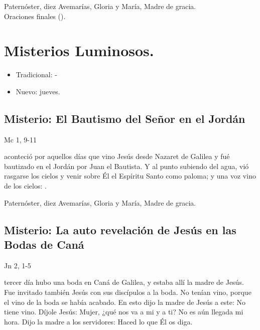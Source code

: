\documentclass[./main.tex]{subfiles}
\newcounter{lux-counter}
\begin{document}
\begin{center}
      Paternóster, diez Avemarías, Gloria y María, Madre de gracia.\\
      Oraciones finales ().
\end{center}

\section*{Misterios Luminosos.}
\begin{itemize}
      \item Tradicional: -
      \item Nuevo: jueves.
\end{itemize}

\subsection*{ Misterio: El Bautismo del Señor en el Jordán}
\begin{flushright}
      {\color{red}Mc 1, 9-11}
\end{flushright}
 aconteció por aquellos días que vino Jesús desde Nazaret de Galilea y fué bautizado en el Jordán por Juan el Bautista. 
Y al punto subiendo del agua, vió rasgarse los cielos y venir sobre Él el Espíritu Santo como paloma; y una voz vino de los cielos: 
.

\begin{center}
      Paternóster, diez Avemarías, Gloria y María, Madre de gracia.
\end{center}

\subsection*{ Misterio: La auto revelación de Jesús en las Bodas de Caná}
\begin{flushright}
      {\color{red}Jn 2, 1-5}
\end{flushright}
 tercer día hubo una boda en Caná de Galilea, y estaba allí la madre de Jesús. Fue invitado también Jesús con sus discípulos a la boda. 
No tenían vino, porque el vino de la boda se había acabado. En esto dijo la madre de Jesús a este: No tiene vino. Díjole Jesús: Mujer, 
¿qué nos va a mi y a ti? No es aún llegada mi hora. Dijo la madre a los servidores: Haced lo que Él os diga.
\end{document}
